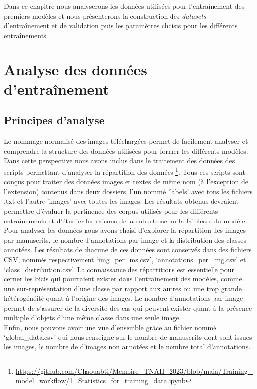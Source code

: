 \documentclass[12pt,twoside]{book}
\begin{document}
Dans ce chapitre nous analyserons les données utilisées pour l’entraînement des premiers modèles et nous présenterons la construction des \textit{datasets} d’entraînement et de validation puis les paramètres choisis pour les différents entraînements.  

\section{Analyse des données d’entraînement}
\subsection{Principes d'analyse}

Le nommage normalisé des images téléchargées permet de facilement analyser et comprendre la structure des données utilisées pour former les différents modèles. Dans cette perspective nous avons inclus dans le traitement des données des scripts permettant d’analyser la répartition des données \footnote{\url{https://github.com/Chaouabti/Memoire_TNAH_2023/blob/main/Training_model_workflow/1_Statistics_for_training_data.ipynb}}. Tous ces scripts sont conçus pour traiter des données images et textes de même nom (à l'exception de l'extension) contenus dans deux dossiers, l'un nommé 'labels' avec tous les fichiers .txt et l'autre 'images' avec toutes les images. Les résultats obtenus devraient permettre d'évaluer la pertinence des corpus utilisés pour les différents entraînements et d'étudier les raisons de la robustesse ou la faiblesse du modèle.\\

Pour analyser les données nous avons choisi d’explorer la répartition des images par manuscrits, le nombre d’annotations par image et la distribution des classes annotées. Les résultats de chacune de ces données sont conservés dans des fichiers CSV, nommés respectivement ‘img\_per\_ms.csv’, ‘annotations\_per\_img.csv’ et ‘class\_distribution.csv’. La connaissance des répartitions est essentielle pour cerner les biais qui pourraient exister dans l’entraînement des modèles, comme une sur-représentation d’une classe par rapport aux autres ou une trop grande hétérogénéité quant à l’origine des images. Le nombre d’annotations par image permet de s’assurer de la diversité des cas qui peuvent exister quant à la présence multiple d’objets d’une même classe dans une seule image. \\

Enfin, nous pouvons avoir une vue d’ensemble grâce au fichier nommé ‘global\_data.csv’ qui nous renseigne sur le nombre de manuscrits dont sont issues les images, le nombre de d’images non annotées et le nombre total d’annotations.
\end{document}

